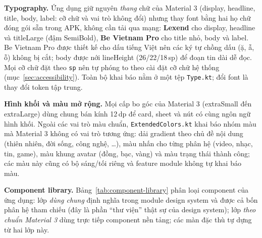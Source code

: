 \textbf{Typography.} Ứng dụng giữ nguyên \emph{thang} chữ của Material 3 (display, headline, title, body, label: cỡ chữ và vai trò không đổi) nhưng thay font bằng hai họ chữ đóng gói sẵn trong APK, không cần tải qua mạng: \textbf{Lexend} cho display, headline và titleLarge (đậm SemiBold), \textbf{Be Vietnam Pro} cho title nhỏ, body và label. Be Vietnam Pro được thiết kế cho dấu tiếng Việt nên các ký tự chồng dấu (ặ, ẫ, ỗ) không bị cắt; body được nới lineHeight (26/22/18\,sp) để đoạn tin dài dễ đọc. Mọi cỡ chữ đặt theo \texttt{sp} nên tự phóng to theo cài đặt cỡ chữ hệ thống (mục~\ref{sec:accessibility}). Toàn bộ khai báo nằm ở một tệp \texttt{Type.kt}; đổi font là thay đổi token tập trung.

\textbf{Hình khối và màu mở rộng.} Mọi cấp bo góc của Material 3 (extraSmall đến extraLarge) dùng chung bán kính 12\,dp để card, sheet và nút có cùng ngôn ngữ hình khối. Ngoài các vai trò màu chuẩn, \texttt{ExtendedColors.kt} khai báo nhóm màu mà Material 3 không có vai trò tương ứng: dải gradient theo chủ đề nội dung (thiên nhiên, đời sống, công nghệ, \ldots), màu nhấn cho từng phân hệ (video, nhạc, tin, game), màu khung avatar (đồng, bạc, vàng) và màu trạng thái thành công; các màu này cũng có bộ sáng/tối riêng và feature module không tự khai báo màu.

\textbf{Component library.} Bảng~\ref{tab:component-library} phân loại component của ứng dụng: lớp \textit{dùng chung} định nghĩa trong module design system và được cả bốn phân hệ tham chiếu (đây là phần ``thư viện'' thật sự của design system); lớp \textit{theo chuẩn Material 3} dùng trực tiếp component nền tảng; các màn đặc thù tự dựng từ hai lớp này.

